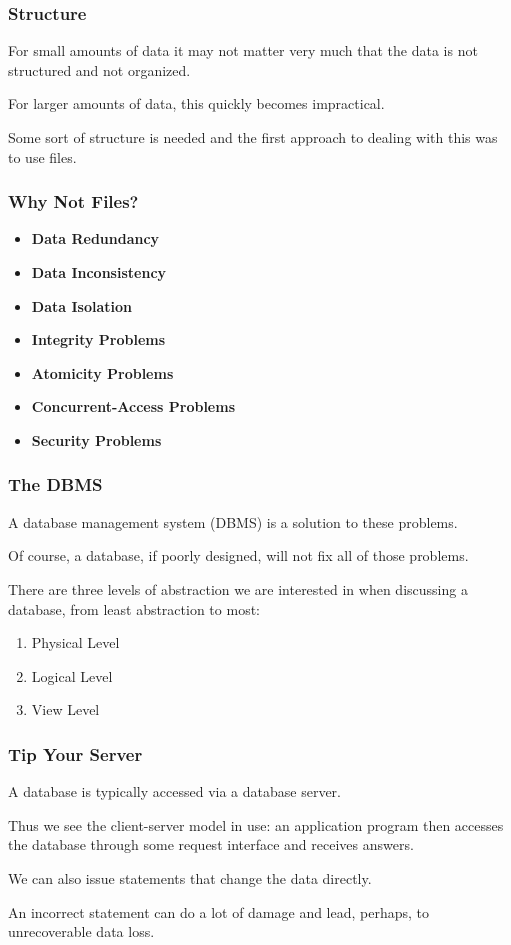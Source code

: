 \begin{frame}
\frametitle{Structure}

For small amounts of data it may not matter very much that the data is not structured and not organized. 

For larger amounts of data, this quickly becomes impractical. 

Some sort of structure is needed and the first approach to dealing with this was to use files.

\end{frame}



\begin{frame}
\frametitle{Why Not Files?}
\begin{itemize}
	\item \textbf{Data Redundancy}
	\item \textbf{Data Inconsistency}
	\item \textbf{Data Isolation}
	\item \textbf{Integrity Problems}
	\item \textbf{Atomicity Problems}
	\item \textbf{Concurrent-Access Problems}
	\item \textbf{Security Problems}
\end{itemize}
\end{frame}



\begin{frame}
\frametitle{The DBMS}

A database management system (DBMS) is a solution to these problems. 

Of course, a database, if poorly designed, will not fix all of those problems. 

There are three levels of abstraction we are interested in when discussing a database, from least abstraction to most:

\begin{enumerate}
	\item Physical Level
	\item Logical Level
	\item View Level
\end{enumerate}

\end{frame}



\begin{frame}
\frametitle{Tip Your Server}

A database is typically accessed via a database server. 

Thus we see the client-server model in use: an application program then accesses the database through some request interface and receives answers. 

We can also issue statements that change the data directly.

An incorrect statement can do a lot of damage and lead, perhaps, to unrecoverable data loss. 

\end{frame}



